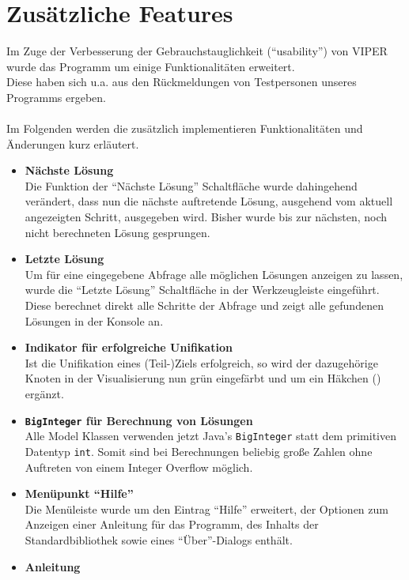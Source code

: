 \documentclass[parskip=full,11pt,twoside]{scrartcl}
\begin{document}
\section{Zusätzliche Features}

Im Zuge der Verbesserung der Gebrauchstauglichkeit (\enquote{usability}) von VIPER wurde das Programm um einige Funktionalitäten erweitert.\\
Diese haben sich u.a. aus den Rückmeldungen von Testpersonen unseres Programms ergeben.\\\\
Im Folgenden werden die zusätzlich implementieren Funktionalitäten und Änderungen kurz erläutert.

\begin{itemize}
  \item \textbf{Nächste Lösung}\\
        Die Funktion der \enquote{Nächste Lösung} Schaltfläche wurde dahingehend verändert, dass nun die nächste auftretende Lösung, ausgehend vom aktuell angezeigten Schritt, ausgegeben wird. Bisher wurde bis zur nächsten, noch nicht berechneten Lösung gesprungen.
  \item \textbf{Letzte Lösung}\\
        Um für eine eingegebene Abfrage alle möglichen Lösungen anzeigen zu lassen, wurde die \enquote{Letzte Lösung} Schaltfläche in der Werkzeugleiste eingeführt. Diese berechnet direkt alle Schritte der Abfrage und zeigt alle gefundenen Lösungen in der Konsole an.
  \item \textbf{Indikator für erfolgreiche Unifikation}\\
        Ist die Unifikation eines (Teil-)Ziels erfolgreich, so wird der dazugehörige Knoten in der Visualisierung nun grün eingefärbt und um ein Häkchen () ergänzt.
  \item \textbf{\texttt{BigInteger} für Berechnung von Lösungen}\\
        Alle Model Klassen verwenden jetzt Java's \texttt{BigInteger} statt dem primitiven Datentyp \texttt{int}. Somit sind bei Berechnungen beliebig große Zahlen ohne Auftreten von einem Integer Overflow möglich.
  \item \textbf{Menüpunkt \enquote{Hilfe}}\\
        Die Menüleiste wurde um den Eintrag \enquote{Hilfe} erweitert, der Optionen zum Anzeigen einer Anleitung für das Programm, des Inhalts der Standardbibliothek sowie eines \enquote{Über}-Dialogs enthält.
  \item \textbf{Anleitung}\\

\end{itemize}
\end{document}
